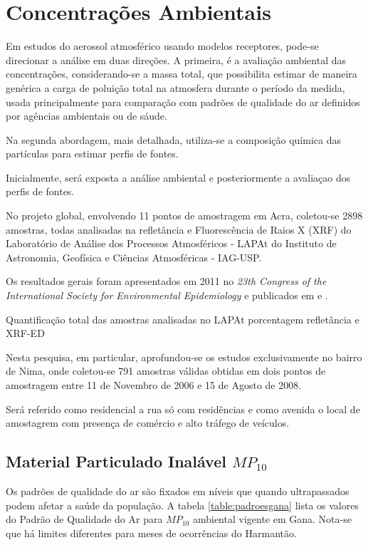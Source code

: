 \section{Concentrações Ambientais}

Em estudos do aerossol atmosférico usando modelos receptores, 
pode-se direcionar a análise em duas direções. 
A primeira, é a avaliação ambiental das concentrações, considerando-se a massa total,
que possibilita estimar de maneira genérica a carga de poluição total na atmosfera 
durante o período da medida, usada principalmente para comparação com padrões
de qualidade do ar definidos por agências ambientais ou de sáude. 

Na segunda abordagem, mais detalhada, utiliza-se a composição química 
das partículas para estimar perfis de fontes. 

Inicialmente, será exposta a análise ambiental e posteriormente a 
avaliaçao dos perfis de fontes.  

No projeto global, envolvendo 11 pontos de amostragem em Acra, 
coletou-se 2898 amostras, todas analisadas na refletância e 
Fluorescência de Raios X (XRF) do 
Laboratório de Análise dos Processos Atmosféricos - LAPAt
do Instituto de Astronomia, Geofísica e Ciências Atmosféricas - IAG-USP.

Os resultados gerais foram apresentados em 2011 no
\textit{23th Congress of the International Society for Environmental 
Epidemiology} \citep{zhou2011} e publicados em \cite{zhou2013} e \cite{zhou2014}. 

\begin{table}[H]
  \centering
    
  \caption{Quantificação total das amostras analisadas no LAPAt porcentagem
          refletância e XRF-ED}
\end{table}

Nesta pesquisa, em particular, aprofundou-se os estudos exclusivamente no bairro
de Nima, onde coletou-se 791 amostras válidas obtidas em dois pontos de 
amostragem entre 11 de Novembro de 2006 e 15 de Agosto de 2008.

Será referido como residencial a rua só com residências e como avenida 
o local de amostagrem com presença de comércio e alto tráfego de veículos.

\subsection{Material Particulado Inalável $MP_{10}$}

Os padrões de qualidade do ar são fixados em níveis que quando ultrapassados 
podem afetar a saúde da população. 
A tabela \ref{table:padroesgana} lista os valores do Padrão de Qualidade do Ar 
para $MP_{10}$ ambiental vigente em Gana. Nota-se que há limites diferentes para 
meses de ocorrências do Harmantão. 

